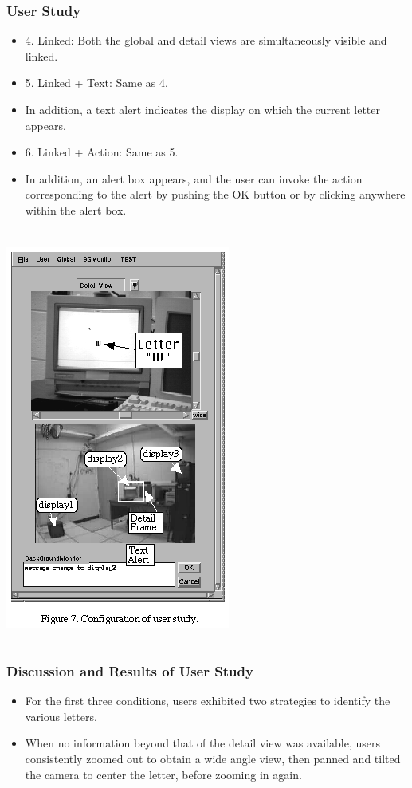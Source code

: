 \documentclass{beamer}
\begin{document}
\begin{frame}
\frametitle{User Study}

\begin{itemize}
\item 4. Linked: Both the global and detail views are simultaneously visible and linked.
\item 5. Linked + Text: Same as 4.
\item In addition, a text alert indicates the display on which the current letter appears.
\item 6. Linked + Action: Same as 5.
\item In addition, an alert box appears, and the user can invoke the action corresponding to the alert by pushing the OK button or by clicking anywhere within the alert box.
\end{itemize}

\end{frame}

\begin{frame}
\frametitle{}


\begin{columns}

\centerline{\includegraphics[width=0.500000\linewidth,keepaspectratio]{ky_fg7.png}}

\end{columns}

\end{frame}

\begin{frame}
\frametitle{Discussion and Results of User Study}

\begin{itemize}
\item For the first three conditions, users exhibited two strategies to identify the various letters.
\item When no information beyond that of the detail view was available, users consistently zoomed out to obtain a wide angle view, then panned and tilted the camera to center the letter, before zooming in again.
\end{itemize}

\end{frame}
\end{document}
